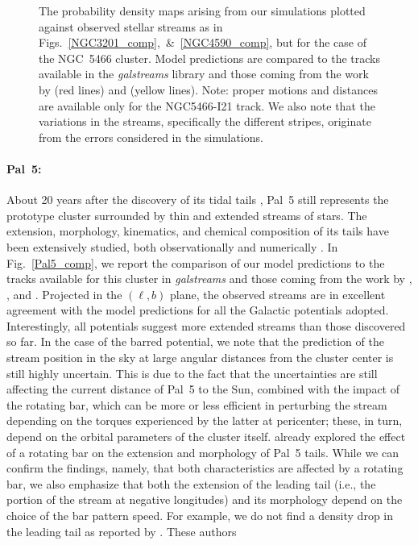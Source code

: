 \begin{figure}
                \caption{The probability density maps arising from our simulations plotted against observed stellar streams as in Figs.~\ref{NGC3201_comp},~\&~\ref{NGC4590_comp}, but for the case of the NGC~5466 cluster. Model predictions are compared to the tracks available in the \textit{galstreams} library and those coming from the work by  \citet{grillmair06c} (red lines) and \citet{2021ApJ...914..123I} (yellow lines). Note: proper motions and distances are available only for the NGC5466-I21 track. We also note that the variations in the streams, specifically the different stripes, originate from the errors considered in the simulations.\label{NGC5466_comp}}
            \end{figure}  
            \onecolumn          
            
            \paragraph{Pal~5: } About 20 years after the discovery of its tidal tails \citep{2001ApJ...548L.165O, 2003AJ....126.2385O}, Pal~5 still represents the prototype cluster surrounded by thin and extended streams of stars. The extension, morphology, kinematics, and chemical composition of its tails have been extensively studied, both observationally and numerically \citep{2003AJ....126.2385O, 2002AJ....124..349R, 2004AJ....127.2753D, koch04, grillmair06, 2009AJ....137.3378O, 2012A&A...546L...7M, kupper15, 2015MNRAS.446.3297K, fritz15, ibata16, ishigaki16, 2016MNRAS.460.2711T, koch17, ibata17, 2017NatAs...1..633P, 2019AJ....158..223P, 2020MNRAS.493.4978S, bonaca20b, 2021ApJ...914..123I,  philips22, kuzma22}. In Fig.~\ref{Pal5_comp}, we report the comparison of our model predictions to the tracks available for this cluster in \textit{galstreams} and  those coming from the work by \citet{2019AJ....158..223P}, \citet{2020MNRAS.493.4978S}, and \citet{2021ApJ...914..123I}. Projected in the $(\ell, b)$ plane, the observed streams are in excellent agreement with the model predictions for all the Galactic potentials adopted. Interestingly, all potentials suggest more extended streams than those discovered so far. In the case of the barred potential, we note that the prediction of the stream position in the sky at large angular distances from the cluster center is still highly uncertain. This is due to the fact that the uncertainties are still affecting the current distance of Pal~5 to the Sun, combined with the impact of the rotating bar, which can be more or less efficient in perturbing the stream depending on the torques experienced by the latter at pericenter; these, in turn, depend on the orbital parameters of the cluster itself. \citet{2017NatAs...1..633P} already explored the effect of a rotating bar on the extension and morphology of Pal~5 tails. While we can confirm the \citet{2017NatAs...1..633P} findings, namely, that both characteristics are affected by a rotating bar, we also emphasize that both the extension of the leading tail (i.e., the portion of the stream at negative longitudes) and its morphology depend on the choice of the bar pattern speed. For example, we do not find a density drop in the leading tail as reported by  \citet{2017NatAs...1..633P}. These authors 